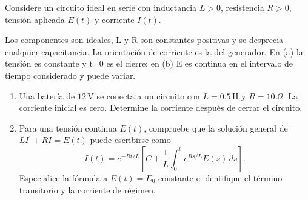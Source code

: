 Considere un circuito ideal en serie con inductancia $L>0$, resistencia $R>0$, tensión aplicada $E(t)$ y corriente $I(t)$.

Los componentes son ideales, L y R son constantes positivas y se desprecia cualquier capacitancia. La orientación de corriente es la del generador. En (a) la tensión es constante y t=0 es el cierre; en (b) E es continua en el intervalo de tiempo considerado y puede variar.

\begin{enumerate}[label=(\alph*),ref=\alph*,leftmargin=*]
\item Una batería de $12\,\mathrm V$ se conecta a un circuito con $L=0.5\,\mathrm H$ y $R=10\,\Omega$. La corriente inicial es cero. Determine la corriente después de cerrar el circuito.
\item Para una tensión continua $E(t)$, compruebe que la solución general de $LI^{\prime}+RI=E(t)$ puede escribirse como \[I(t)=e^{-Rt/L}\left[C+\frac1L\int_0^t e^{Rs/L}E(s)\,ds\right].\] Especialice la fórmula a $E(t)=E_0$ constante e identifique el término transitorio y la corriente de régimen.
\end{enumerate}
